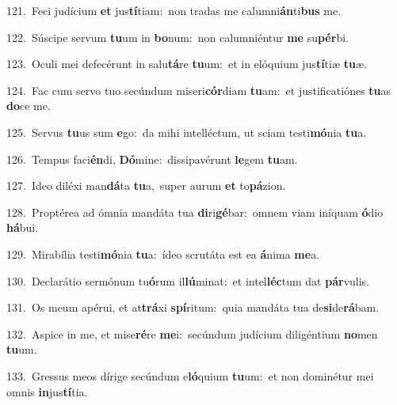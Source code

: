 {\numbfont\textcolor{\numbcolor}{121.}}~Feci judícium \textbf{et} jus\-\textbf{tí}\-tiam:~\star non tradas me calumni\-\textbf{án}\-ti\textbf{bus} me.\par
{\numbfont\textcolor{\numbcolor}{122.}}~Súscipe servum \textbf{tu}\-um in \textbf{bo}\-num:~\star non calumniéntur \textbf{me} su\-\textbf{pér}\-bi.\par
{\numbfont\textcolor{\numbcolor}{123.}}~Oculi mei defecérunt in salu\-\textbf{tá}\-re \textbf{tu}\-um:~\star et in elóquium jus\-\textbf{tí}\-tiæ \textbf{tu}\-æ.\par
{\numbfont\textcolor{\numbcolor}{124.}}~Fac cum servo tuo secúndum miseri\-\textbf{cór}\-diam \textbf{tu}\-am:~\star et justificatiónes \textbf{tu}\-as \textbf{do}\-ce me.\par
{\numbfont\textcolor{\numbcolor}{125.}}~Servus \textbf{tu}\-us sum \textbf{e}\-go:~\star da mihi intelléctum, ut sciam testi\-\textbf{mó}\-nia \textbf{tu}\-a.\par
{\numbfont\textcolor{\numbcolor}{126.}}~Tempus faci\-\textbf{én}\-di, \textbf{Dó}\-mine:~\star dissipavérunt \textbf{le}\-gem \textbf{tu}\-am.\par
{\numbfont\textcolor{\numbcolor}{127.}}~Ideo diléxi man\-\textbf{dá}\-ta \textbf{tu}\-a,~\star super aurum \textbf{et} to\-\textbf{pá}\-zion.\par
{\numbfont\textcolor{\numbcolor}{128.}}~Proptérea ad ómnia mandáta tua \textbf{di}\-ri\-\textbf{gé}\-bar:~\star omnem viam iníquam \textbf{ó}\-dio \textbf{há}\-bui.\par
{\numbfont\textcolor{\numbcolor}{129.}}~Mirabília testi\-\textbf{mó}\-nia \textbf{tu}\-a:~\star ídeo scrutáta est ea \textbf{á}\-nima \textbf{me}\-a.\par
{\numbfont\textcolor{\numbcolor}{130.}}~Declarátio sermónum tu\-\textbf{ó}\-rum il\-\textbf{lú}\-minat:~\star et intel\-\textbf{léc}\-tum dat \textbf{pár}\-vulis.\par
{\numbfont\textcolor{\numbcolor}{131.}}~Os meum apérui, et at\-\textbf{trá}\-xi \textbf{spí}\-ritum:~\star quia mandáta tua de\-\textbf{si}\-de\-\textbf{rá}\-bam.\par
{\numbfont\textcolor{\numbcolor}{132.}}~Aspice in me, et mise\-\textbf{ré}\-re \textbf{me}\-i:~\star secúndum judícium diligéntium \textbf{no}\-men \textbf{tu}\-um.\par
{\numbfont\textcolor{\numbcolor}{133.}}~Gressus meos dírige secúndum e\-\textbf{ló}\-quium \textbf{tu}\-um:~\star et non dominétur mei omnis \textbf{in}\-jus\-\textbf{tí}\-tia.\par

